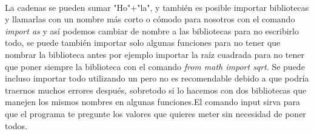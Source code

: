 \documentclass{article}
\begin{document}
\\
La cadenas se pueden  sumar "Ho"+"la", y también es posible importar bibliotecas y llamarlas con un nombre más corto o cómodo para nosotros con el comando \textit{import as} y así podemos cambiar de nombre a las bibliotecas para no escribirlo todo, se puede también importar solo algunas funciones para no tener que nombrar la biblioteca antes por ejemplo importar la raíz cuadrada para no tener que poner siempre la biblioteca con el comando \textit{from math import sqrt}. Se puede incluso importar todo utilizando un \* pero no es recomendable debido a que podría traernos muchos errores después, sobretodo si lo hacemos con dos bibliotecas que manejen los mismos nombres en algunas funciones.El comando input sirva para que el programa te pregunte los valores que quieres meter sin necesidad de poner todos.
\end{document}
